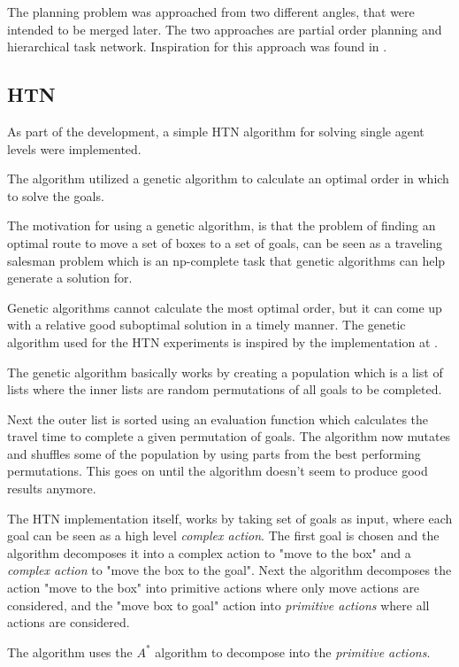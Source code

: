 \documentclass[Main]{subfiles}
\begin{document}
\FloatBarrier

The planning problem was approached from two different angles, that were
intended to be merged later. The two approaches are partial order planning and
hierarchical task network. Inspiration for this approach was found in
\cite{pellier2007unified}. 

\subsection{HTN}
As part of the development, a simple HTN algorithm for solving single agent
levels were implemented.

The algorithm utilized a genetic algorithm to calculate an optimal order in
which to solve the goals.

The motivation for using a genetic algorithm, is that the problem of finding an
optimal route to move a set of boxes to a set of goals, can be seen as a
traveling salesman problem which is an np-complete task that genetic algorithms
can help generate a solution for.

Genetic algorithms cannot calculate the most optimal order, but it can come up
with a relative good suboptimal solution in a timely manner. The genetic
algorithm used for the HTN experiments is inspired by the implementation at
\cite{genetic}.

The genetic algorithm basically works by creating a population which is a list
of lists where the inner lists are random permutations of all goals to be
completed.

Next the outer list is sorted using an evaluation function which calculates the
travel time to complete a given permutation of goals.
The algorithm now mutates and shuffles some of the population by using parts
from the best performing permutations.
This goes on until the algorithm doesn't seem to produce good results anymore.

The HTN implementation itself, works by taking set of goals as input, where each
goal can be seen as a high level \textit{complex action}. The first goal is
chosen and the algorithm decomposes it into a complex action to "move to the
box" and a \textit{complex action} to "move the box to the goal". Next the
algorithm decomposes the action "move to the box" into primitive actions where
only move actions are considered, and the "move box to goal" action into
\textit{primitive actions} where all actions are considered.

The algorithm uses the $A^*$ algorithm to decompose into the \textit{primitive
  actions}.
\end{document}
